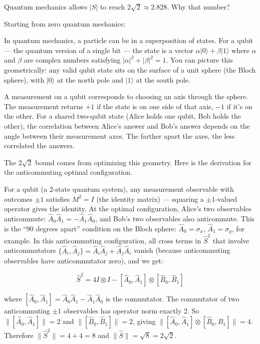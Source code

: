 \documentclass[11pt,a4paper]{article}
\theoremstyle{plain}
\theoremstyle{definition}
\theoremstyle{remark}
\begin{document}
Quantum mechanics allows $|S|$ to reach $2\sqrt{2} \approx 2.828$. Why that number?

Starting from zero quantum mechanics:

In quantum mechanics, a particle can be in a superposition of states. For a qubit --- the quantum version of a single bit --- the state is a vector $\alpha|0\rangle + \beta|1\rangle$ where $\alpha$ and $\beta$ are complex numbers satisfying $|\alpha|^2 + |\beta|^2 = 1$. You can picture this geometrically: any valid qubit state sits on the surface of a unit sphere (the Bloch sphere), with $|0\rangle$ at the north pole and $|1\rangle$ at the south pole.

A measurement on a qubit corresponds to choosing an axis through the sphere. The measurement returns $+1$ if the state is on one side of that axis, $-1$ if it's on the other. For a shared two-qubit state (Alice holds one qubit, Bob holds the other), the correlation between Alice's answer and Bob's answer depends on the angle between their measurement axes. The farther apart the axes, the less correlated the answers.

The $2\sqrt{2}$ bound comes from optimizing this geometry. Here is the derivation for the anticommuting optimal configuration.

For a qubit (a 2-state quantum system), any measurement observable with outcomes $\pm 1$ satisfies $M^2 = I$ (the identity matrix) --- squaring a $\pm 1$-valued operator gives the identity. At the optimal configuration, Alice's two observables anticommute: $\hat{A}_0 \hat{A}_1 = -\hat{A}_1 \hat{A}_0$, and Bob's two observables also anticommute. This is the ``90 degrees apart'' condition on the Bloch sphere: $\hat{A}_0 = \sigma_x$, $\hat{A}_1 = \sigma_y$, for example. In this anticommuting configuration, all cross terms in $\hat{S}^2$ that involve anticommutators $\{\hat{A}_i, \hat{A}_j\} = \hat{A}_i\hat{A}_j + \hat{A}_j\hat{A}_i$ vanish (because anticommuting observables have anticommutator zero), and we get:

\[
\hat{S}^2 = 4I \otimes I - [\hat{A}_0, \hat{A}_1] \otimes [\hat{B}_0, \hat{B}_1]
\]

where $[\hat{A}_0, \hat{A}_1] = \hat{A}_0 \hat{A}_1 - \hat{A}_1 \hat{A}_0$ is the commutator. The commutator of two anticommuting $\pm 1$ observables has operator norm exactly 2. So $\|[\hat{A}_0,\hat{A}_1]\| = 2$ and $\|[\hat{B}_0,\hat{B}_1]\| = 2$, giving $\|[\hat{A}_0,\hat{A}_1] \otimes [\hat{B}_0,\hat{B}_1]\| = 4$. Therefore $\|\hat{S}^2\| = 4 + 4 = 8$ and $\|\hat{S}\| = \sqrt{8} = 2\sqrt{2}$.
\end{document}
